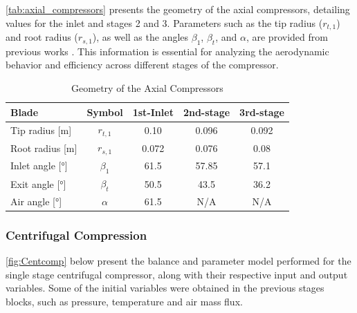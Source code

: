 \documentclass{Format}
\begin{document}
\autoref{tab:axial_compressors} presents the geometry of the axial compressors, detailing values for the inlet and stages 2 and 3. Parameters such as the tip radius ($r_{t,1}$) and root radius ($r_{s,1}$), as well as the angles $\beta_1$, $\beta_t$, and $\alpha$, are provided from previous works \cite{Castellanos2019,Bayona2019PT6A}. This information is essential for analyzing the aerodynamic behavior and efficiency across different stages of the compressor.

\begin{table}[h!]
    \centering
    \begin{tabular}{|l|c|c|c|c|}
        \hline
        \textbf{Blade} & \textbf{Symbol} & \textbf{1st-Inlet} & \textbf{2nd-stage} & \textbf{3rd-stage} \\
        \hline
        Tip radius [m] & $r_{t,1}$ & 0.10 & 0.096 & 0.092 \\
        Root radius [m] & $r_{s,1}$ & 0.072 & 0.076 & 0.08 \\
        Inlet angle [°] & $\beta_1$ & 61.5 & 57.85 & 57.1 \\
        Exit angle [°] & $\beta_t$ & 50.5 & 43.5 & 36.2 \\
        Air angle [°] & $\alpha$ & 61.5 & N/A & N/A \\
        \hline
    \end{tabular}
    \caption{Geometry of the Axial Compressors}
    \label{tab:axial_compressors}
\end{table}

\subsubsection{Centrifugal Compression}

\autoref{fig:Centcomp} below present the balance and parameter model performed for the single stage centrifugal compressor, along with their respective input and output variables. Some of the initial variables were obtained in the previous stages blocks, such as pressure, temperature and air mass flux.
\end{document}
